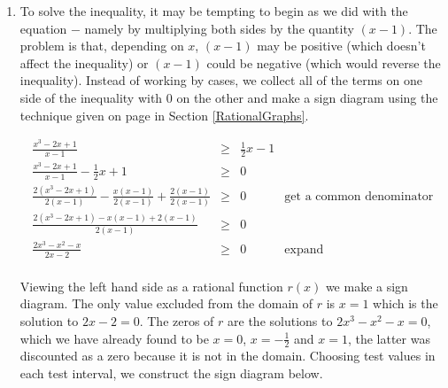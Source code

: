\documentclass{ximera}
\begin{document}
\begin{example}
\begin{enumerate}
\[\begin{array}{rclr}
x(2x+1)(x-1) & = & 0 & \text{factor}\\

x & = & -\frac{1}{2}, \, 0, \, 1 & \\


\end{array}\]

Since we cleared denominators, we need to check for extraneous solutions.  Sure enough, we see that $x=1$ does not satisfy the original equation, so  our only solutions are $x=-\frac{1}{2}$ and $x=0$.

\item  To solve the inequality, it may be tempting to begin as we did with the equation $-$ namely by multiplying both sides by the quantity $(x-1)$.  The problem is that, depending on $x$, $(x-1)$ may be positive (which doesn't affect the inequality) or $(x-1)$ could be negative (which would reverse the inequality).  Instead of working by cases, we collect all of the terms on one side of the inequality with $0$ on the other and make a sign diagram using the technique given on page \pageref{rationalsigndiagram} in Section \ref{RationalGraphs}.

\[ \begin{array}{rclr}

 \frac{x^3-2x+1}{x-1} & \geq &  \frac{1}{2}x-1 & \\  

 \frac{x^3-2x+1}{x-1}  -  \frac{1}{2} x + 1& \geq & 0& \\  

 \frac{2 \left(x^3-2x+1\right)}{2(x-1)}  -  \frac{x(x-1)}{2(x-1)} +  \frac{2(x-1)}{2(x-1)}& \geq & 0&\text{get a common denominator} \\  

 \frac{2\left(x^3-2x+1\right)-x(x-1)+2(x-1)}{2(x-1)} & \geq & 0 & \\  

 \frac{2x^3-x^2-x}{2x-2} & \geq & 0 & \text{expand} \\

\end{array} \]

Viewing the left hand side as a rational function $r(x)$ we make a sign diagram.  The only value excluded from the domain of $r$ is $x=1$ which is the solution to $2x-2=0$.  The zeros of $r$ are the solutions to $2x^3-x^2-x=0$, which we have already found to be $x=0$, $x=-\frac{1}{2}$ and $x=1$, the latter was discounted as a zero because it is not in the domain.  Choosing test values in each test interval, we construct the sign diagram below. 


\end{enumerate}
\end{example}
\end{document}
